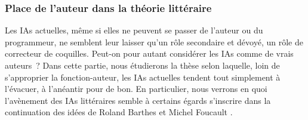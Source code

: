 \documentclass{article}
\begin{document}
			\subsubsection{Place de l'auteur dans la théorie littéraire}\label{place_auteur}
				Les IAs actuelles, même si elles ne peuvent se passer de l'auteur ou du programmeur, ne semblent leur laisser qu'un rôle secondaire et dévoyé, un rôle de correcteur de coquilles. Peut-on pour autant considérer les IAs comme de vrais auteurs~? Dans cette partie, nous étudierons la thèse selon laquelle, loin de s'approprier la fonction-auteur, les IAs actuelles tendent tout simplement à l'évacuer, à l'anéantir pour de bon. En particulier, nous verrons en quoi l'avènement des IAs littéraires semble à certains égards s'inscrire dans la continuation des idées de Roland Barthes \cite{barthes1968} et Michel Foucault \cite{foucault1969}.
				
\end{document}
